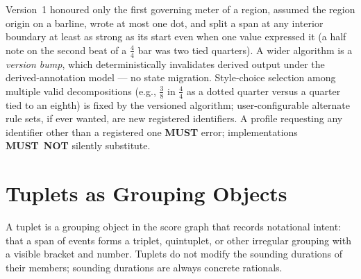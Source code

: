 \documentclass[11pt,letterpaper]{report}
\newcounter{requirement}[chapter]
\newcommand{\MUST}{\textbf{MUST}}
\newcommand{\MUSTNOT}{\textbf{MUST}\nobreak\ \textbf{NOT}}
\begin{document}
\begin{requirement}
  Version~1 honoured only the first governing meter of a region,
  assumed the region origin on a barline, wrote at most one dot, and
  split a span at any interior boundary at least as strong as its
  start even when one value expressed it (a half note on the second
  beat of a $\frac{4}{4}$ bar was two tied quarters). A wider algorithm
  is a \emph{version bump}, which
  deterministically invalidates derived output under the
  derived-annotation model --- no state migration. Style-choice
  selection among multiple valid decompositions (e.g.,
  $\frac{3}{8}$ in $\frac{4}{4}$ as a dotted quarter versus a
  quarter tied to an eighth) is fixed by the versioned algorithm;
  user-configurable alternate rule sets, if ever wanted, are new
  registered identifiers. A profile requesting any identifier
  other than a registered one \MUST{} error; implementations
  \MUSTNOT{} silently substitute.
\end{requirement}

\section{Tuplets as Grouping Objects}
\label{sec:time:tuplets}

A tuplet is a grouping object in the score graph that records
notational intent: that a span of events forms a triplet, quintuplet,
or other irregular grouping with a visible bracket and number. Tuplets
do not modify the sounding durations of their members; sounding
durations are always concrete rationals.
\end{document}
